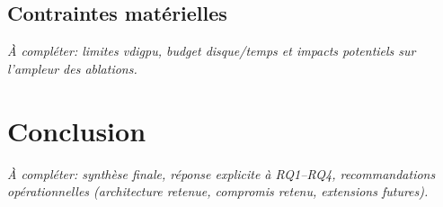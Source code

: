 \documentclass[11pt,a4paper]{article}
\begin{document}
\subsection{Contraintes matérielles}
\textit{À compléter: limites vdigpu, budget disque/temps et impacts potentiels sur l'ampleur des ablations.}

\section{Conclusion}
\textit{À compléter: synthèse finale, réponse explicite à RQ1--RQ4, recommandations opérationnelles (architecture retenue, compromis retenu, extensions futures).}
\end{document}
